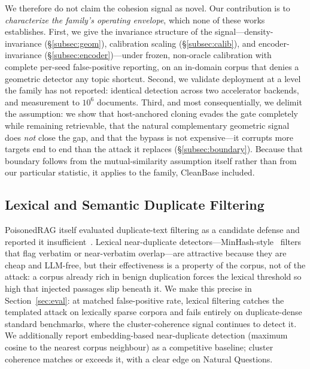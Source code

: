 \documentclass[conference]{IEEEtran}
\begin{document}
We therefore do not claim the cohesion signal as novel. Our contribution is to
\emph{characterize the family's operating envelope}, which none of these works establishes.
First, we give the invariance structure of the signal---density-invariance
(\S\ref{subsec:geom}), calibration scaling (\S\ref{subsec:calib}), and encoder-invariance
(\S\ref{subsec:encoder})---under frozen, non-oracle calibration with complete per-seed
false-positive reporting, on an in-domain corpus that denies a geometric detector any topic
shortcut. Second, we validate deployment at a level the family has not reported: identical
detection across two accelerator backends, and measurement to $10^6$ documents. Third, and most consequentially, we delimit the assumption:
we show that host-anchored cloning evades the gate completely while remaining retrievable, that
the natural complementary geometric signal does \emph{not} close the gap, and that the bypass is
not expensive---it corrupts more targets end to end than the attack it replaces
(\S\ref{subsec:boundary}). Because that
boundary follows from the mutual-similarity assumption itself rather than from our particular
statistic, it applies to the family, CleanBase included.

\subsection{Lexical and Semantic Duplicate Filtering}
PoisonedRAG itself evaluated duplicate-text filtering as a candidate defense and
reported it insufficient~\cite{poisonedrag}. Lexical near-duplicate
detectors---MinHash-style~\cite{minhash} filters that
flag verbatim or near-verbatim overlap---are attractive because they are cheap and
LLM-free, but their effectiveness is
a property of the corpus, not of the attack: a corpus already rich in benign
duplication forces the lexical threshold so high that injected passages slip
beneath it. We make this precise in Section~\ref{sec:eval}: at matched
false-positive rate, lexical filtering catches the templated attack on lexically
sparse corpora and fails entirely on duplicate-dense standard benchmarks, where
the cluster-coherence signal continues to detect it.
We additionally report embedding-based near-duplicate detection (maximum cosine
to the nearest corpus neighbour) as a competitive baseline; cluster coherence
matches or exceeds it, with a clear edge on Natural Questions.
\end{document}

